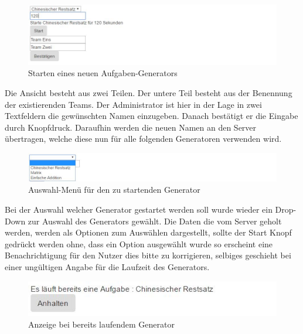 \begin{figure}[htp]     %
\centering
\includegraphics[width=1\textwidth]{bilder/StartNew} 
\caption[Starten eines neuen Aufgaben-Generators]{Starten eines neuen Aufgaben-Generators}
\end{figure} 

Die Ansicht besteht aus zwei Teilen. Der untere Teil besteht aus der Benennung der existierenden Teams. Der Administrator ist hier in der Lage in zwei Textfeldern die gewünschten Namen einzugeben. Danach bestätigt er die Eingabe durch Knopfdruck. Daraufhin werden die neuen Namen an den Server übertragen, welche diese nun für alle folgenden Generatoren verwenden wird. \\

\begin{figure}[htp]     %
\centering
\includegraphics[width=1\textwidth]{bilder/StartDropDown} 
\caption[Auswahl-Menü für den zu startenden Generator]{Auswahl-Menü für den zu startenden Generator}
\end{figure} 

Bei der Auswahl welcher Generator gestartet werden soll wurde wieder ein Drop-Down zur Auswahl des Generators gewählt. Die Daten die vom Server geholt werden, werden als Optionen zum Auswählen dargestellt, sollte der Start Knopf gedrückt werden ohne, dass ein Option ausgewählt wurde so erscheint eine Benachrichtigung für den Nutzer dies bitte zu korrigieren, selbiges geschieht bei einer ungültigen Angabe für die Laufzeit des Generators. \\

\begin{figure}[htp]     %
\centering
\includegraphics[width=1\textwidth]{bilder/TaskRunning} 
\caption[Anzeige bei bereits laufendem Generator]{Anzeige bei bereits laufendem Generator}
\end{figure} 

